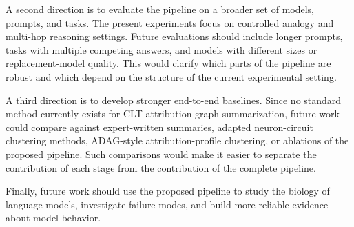 \documentclass[../main.tex]{subfiles}
\begin{document}
A second direction is to evaluate the pipeline on a broader set of models, prompts,
and tasks. The present experiments focus on controlled analogy and multi-hop
reasoning settings. Future evaluations should include longer prompts, tasks with
multiple competing answers, and
models with different sizes or replacement-model quality. This would clarify which
parts of the pipeline are robust and which depend on the structure of the current
experimental setting.

A third direction is to develop stronger end-to-end baselines. Since no standard
method currently exists for CLT attribution-graph summarization, future work
could compare against expert-written summaries, adapted neuron-circuit clustering
methods, ADAG-style attribution-profile clustering, or ablations of the proposed
pipeline. Such comparisons would make it easier to separate the contribution of
each stage from the contribution of the complete pipeline.

Finally, future work should use the proposed pipeline to study the biology of language models, investigate failure modes, and build more reliable evidence about model behavior.
\end{document}
